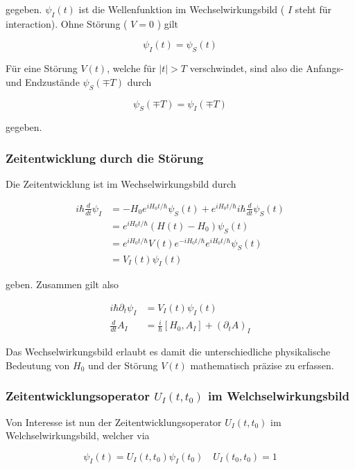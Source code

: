 \documentclass[10pt, letterpaper]{article}
\begin{document}
gegeben. $\psi_{I}(t)$ ist die Wellenfunktion im Wechselwirkungsbild ( $I$ steht für interaction). Ohne Störung ( $V=0$ ) gilt

$$
\psi_{I}(t)=\psi_{S}(t)
$$

Für eine Störung $V(t)$, welche für $|t|>T$ verschwindet, sind also die Anfangs- und Endzustände $\psi_{S}(\mp T)$ durch

$$
\psi_{S}(\mp T)=\psi_{I}(\mp T)
$$

gegeben.

\subsubsection*{Zeitentwicklung durch die Störung}
Die Zeitentwicklung ist im Wechselwirkungsbild durch

$$
\begin{aligned}
i \hbar \frac{d}{d t} \psi_{I} & =-H_{0} e^{i H_{0} t / \hbar} \psi_{S}(t)+e^{i H_{0} t / \hbar} i \hbar \frac{d}{d t} \psi_{S}(t) \\
& =e^{i H_{0} t / \hbar}\left(H(t)-H_{0}\right) \psi_{S}(t) \\
& =e^{i H_{0} t / \hbar} V(t) e^{-i H_{0} t / \hbar} e^{i H_{0} t / \hbar} \psi_{S}(t) \\
& =V_{I}(t) \psi_{I}(t)
\end{aligned}
$$

geben. Zusammen gilt also

$$
\begin{aligned}
i \hbar \partial_{t} \psi_{I} & =V_{I}(t) \psi_{I}(t) \\
\frac{d}{d t} A_{I} & =\frac{i}{\hbar}\left[H_{0}, A_{I}\right]+\left(\partial_{t} A\right)_{I}
\end{aligned}
$$

Das Wechselwirkungsbild erlaubt es damit die unterschiedliche physikalische Bedeutung von $H_{0}$ und der Störung $V(t)$ mathematisch präzise zu erfassen.

\subsubsection*{Zeitentwicklungsoperator $U_{I}\left(t, t_{0}\right)$ im Welchselwirkungsbild}
Von Interesse ist nun der Zeitentwicklungsoperator $U_{I}\left(t, t_{0}\right)$ im Welchselwirkungsbild, welcher via

$$
\psi_{I}(t)=U_{I}\left(t, t_{0}\right) \psi_{I}\left(t_{0}\right) \quad U_{I}\left(t_{0}, t_{0}\right)=1
$$
\end{document}
